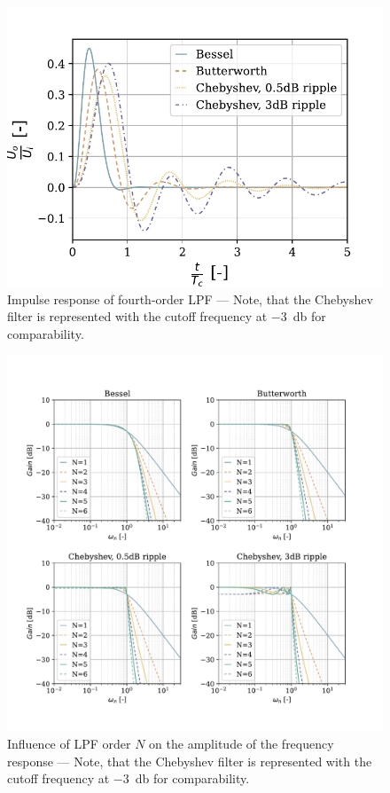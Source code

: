 \begin{figure}[!htb]
  \centering
  \includegraphics[scale=0.72]{figures/electronics/lowpass/lp_filter_4ord_imp}
  \caption[Impulse response of fourth-order \ac{LPF}]{Impulse response of fourth-order \ac{LPF} --- Note, that the Chebyshev filter is represented with the cutoff frequency at \SI{-3}{\decibel} for comparability.%
    \label{fig:lp_filter_4ord_imp}}
\end{figure}

\begin{figure}[!htb]
  \centering
  \includegraphics[scale=0.72]{figures/electronics/lowpass/lp_filter_mag}
  \caption[Influence of \ac{LPF} order $N$ on the amplitude of the frequency response]{Influence of \ac{LPF} order $N$ on the amplitude of the frequency response --- Note, that the Chebyshev filter is represented with the cutoff frequency at \SI{-3}{\decibel} for comparability.%
    \label{fig:lp_filter_mag}}
\end{figure}

